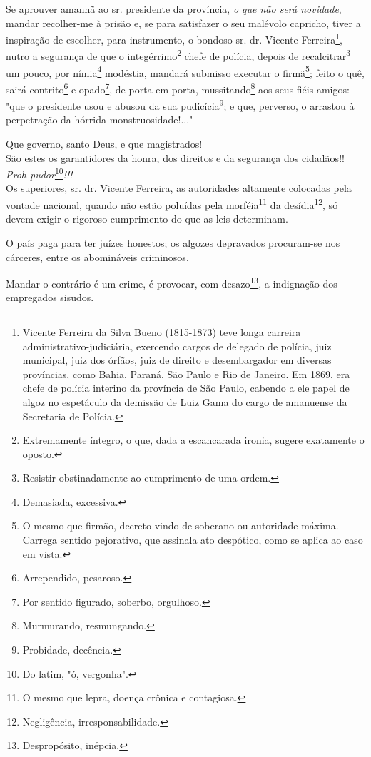 Se aprouver amanhã ao sr. presidente da província, \emph{o que não será
novidade}, mandar recolher-me à prisão e, se para satisfazer o seu
malévolo capricho, tiver a inspiração de escolher, para instrumento, o
bondoso sr. dr. Vicente Ferreira\footnote{Vicente Ferreira da Silva
  Bueno (1815-1873) teve longa carreira administrativo-judiciária,
  exercendo cargos de delegado de polícia, juiz municipal, juiz dos
  órfãos, juiz de direito e desembargador em diversas províncias, como
  Bahia, Paraná, São Paulo e Rio de Janeiro. Em 1869, era chefe de
  polícia interino da província de São Paulo, cabendo a ele papel de
  algoz no espetáculo da demissão de Luiz Gama do cargo de amanuense da
  Secretaria de Polícia.}, nutro a segurança de que o
integérrimo\footnote{Extremamente íntegro, o que, dada a escancarada
  ironia, sugere exatamente o oposto.} chefe de polícia, depois de
recalcitrar\footnote{Resistir obstinadamente ao cumprimento de uma
  ordem.} um pouco, por nímia\footnote{Demasiada, excessiva.}
modéstia, mandará submisso executar o firmã\footnote{O mesmo que
  firmão, decreto vindo de soberano ou autoridade máxima. Carrega
  sentido pejorativo, que assinala ato despótico, como se aplica ao caso
  em vista.}; feito o quê, sairá contrito\footnote{Arrependido,
  pesaroso.} e opado\footnote{Por sentido figurado, soberbo,
  orgulhoso.}, de porta em porta, mussitando\footnote{Murmurando,
  resmungando.} aos seus fiéis amigos: "que o presidente usou e abusou
da sua pudicícia\footnote{Probidade, decência.}; e que, perverso, o
arrastou à perpetração da hórrida monstruosidade!..."

Que governo, santo Deus, e que magistrados!\\
São estes os garantidores da honra, dos direitos e da segurança dos
cidadãos!!\\
\emph{Proh pudor}\footnote{Do latim, "ó, vergonha".}\emph{!!!}\\
Os superiores, sr. dr. Vicente Ferreira, as autoridades altamente
colocadas pela vontade nacional, quando não estão poluídas pela
morféia\footnote{O mesmo que lepra, doença crônica e contagiosa.} da
desídia\footnote{Negligência, irresponsabilidade.}, só devem exigir o
rigoroso cumprimento do que as leis determinam.

O país paga para ter juízes honestos; os algozes depravados procuram-se
nos cárceres, entre os abomináveis criminosos.

Mandar o contrário é um crime, é provocar, com desazo\footnote{
  Despropósito, inépcia.}, a indignação dos empregados sisudos.

